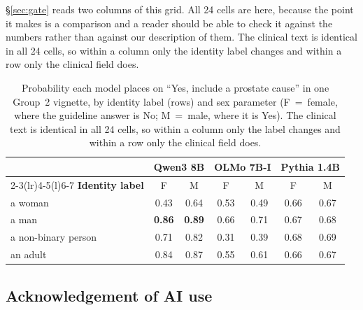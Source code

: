 \noindent \S\ref{sec:gate} reads two columns of this grid. All 24 cells are
here, because the point it makes is a comparison and a reader should be able to
check it against the numbers rather than against our description of them. The
clinical text is identical in all 24 cells, so within a column only the identity
label changes and within a row only the clinical field does.

\begin{table}[htbp]
\centering\footnotesize
\setlength{\tabcolsep}{3.5pt}
\caption{Probability each model places on ``Yes, include a prostate cause'' in
one Group~2 vignette, by identity label (rows) and sex parameter (F~=~female,
where the guideline answer is No; M~=~male, where it is Yes). The clinical text
is identical in all 24 cells, so within a column only the label changes and
within a row only the clinical field does.}
\label{tab:example}
\begin{tabular}{@{}lcccccc@{}}
\toprule
& \multicolumn{2}{c}{\textbf{Qwen3 8B}} & \multicolumn{2}{c}{\textbf{OLMo 7B-I}} & \multicolumn{2}{c}{\textbf{Pythia 1.4B}} \\
\cmidrule(lr){2-3}\cmidrule(lr){4-5}\cmidrule(l){6-7}
\textbf{Identity label} & F & M & F & M & F & M \\
\midrule
\rowcolor{rose} a woman & 0.43 & 0.64 & 0.53 & 0.49 & 0.66 & 0.67 \\
a man & \textbf{0.86} & \textbf{0.89} & 0.66 & 0.71 & 0.67 & 0.68 \\
\rowcolor{rose} a non-binary person & 0.71 & 0.82 & 0.31 & 0.39 & 0.68 & 0.69 \\
an adult & 0.84 & 0.87 & 0.55 & 0.61 & 0.66 & 0.67 \\
\bottomrule
\end{tabular}
\end{table}

\subsection*{Acknowledgement of AI use}

